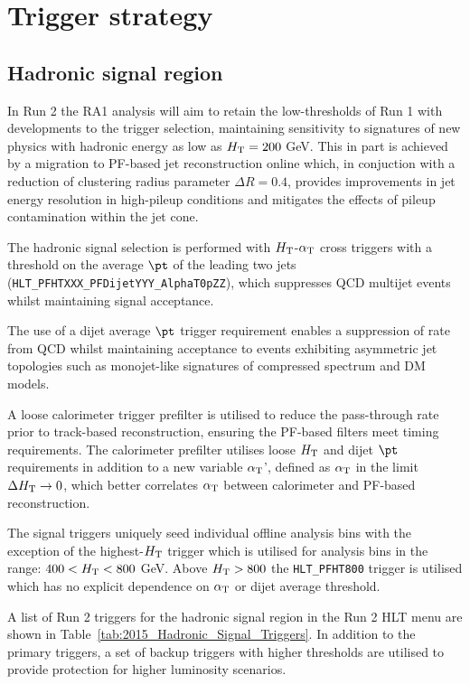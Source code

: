 \section{Trigger strategy}
\label{sec:triggers}


\subsection{Hadronic signal region}

In Run 2 the RA1 analysis will aim to retain the low-thresholds of Run 1 with developments to the trigger selection, maintaining sensitivity to signatures of new physics with hadronic energy as low as $\mbox{$H_\text{T}$} = 200$ GeV. This in part is achieved by a migration to PF-based jet reconstruction online which, in conjuction with a reduction of clustering radius parameter $\Delta R = 0.4$, provides improvements in jet energy resolution in high-pileup conditions and mitigates the effects of pileup contamination within the jet cone.

The hadronic signal selection is performed with $\mbox{$H_\text{T}$}$-$\alpha_{\text{T}}$ cross triggers with a threshold on the average $\pt$ of the leading two jets (\verb!HLT_PFHTXXX_PFDijetYYY_AlphaT0pZZ!), which suppresses QCD multijet events whilst maintaining signal acceptance. 

The use of a dijet average $\pt$ trigger requirement enables a suppression of rate from QCD whilst maintaining acceptance to events exhibiting asymmetric jet topologies such as monojet-like signatures of compressed spectrum and DM models.


 A loose calorimeter trigger prefilter is utilised to reduce the pass-through rate prior to track-based reconstruction, ensuring the PF-based filters meet timing requirements. The calorimeter prefilter utilises loose $\mbox{$H_\text{T}$}$ and dijet $\pt$ requirements in addition to a new variable $\alpha_{\text{T}}$', defined as $\alpha_{\text{T}}$ in the limit $\Delta\mbox{$H_\text{T}$} \rightarrow 0$, which better correlates $\alpha_{\text{T}}$ between calorimeter and PF-based reconstruction.

The signal triggers uniquely seed individual offline analysis bins with the exception of the highest-$\mbox{$H_\text{T}$}$ trigger which is utilised for analysis bins in the range: $400 < \mbox{$H_\text{T}$} < 800$ GeV. Above $\mbox{$H_\text{T}$} > 800$ the \verb!HLT_PFHT800! trigger is utilised which has no explicit dependence on $\alpha_{\text{T}}$ or dijet average threshold. 


A list of Run 2 triggers for the hadronic signal region in the Run 2 HLT menu are shown in Table~\ref{tab:2015_Hadronic_Signal_Triggers}. 
In addition to the primary triggers, a set of backup triggers with higher thresholds are utilised to provide protection for higher luminosity scenarios.


